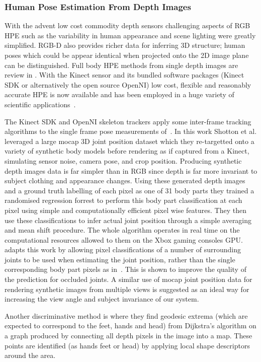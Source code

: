 \documentclass[11pt]{article} %
\begin{document}
\subsubsection{Human Pose Estimation From Depth Images}

With the advent low cost commodity depth sensors challenging aspects of RGB HPE such as the variability in human appearance and scene lighting were greatly simplified. RGB-D also provides richer data for inferring 3D structure; human poses which could be appear identical when projected onto the 2D image plane can be distinguished. Full body HPE methods from single depth images are review in \cite{Helten2013}. With the Kinect sensor and its bundled software packages (Kinect SDK or alternatively the open source OpenNI) low cost, flexible and reasonably accurate HPE is now available and has been employed in a huge variety of scientific applications~\cite{Han2013,Giovanni}.

The Kinect SDK and OpenNI skeleton trackers apply some inter-frame tracking algorithms to the single frame pose measurements of~\cite{Shotton2011}. In this work Shotton et al. leveraged a large mocap 3D joint position dataset which they re-targetted onto a variety of synthetic body models before rendering as if captured from a Kinect, simulating sensor noise, camera pose, and crop position. Producing synthetic depth images data is far simpler than in RGB since depth is far more invariant to subject clothing and appearance changes. Using these generated depth images and a ground truth labelling of each pixel as one of 31 body parts they trained a randomised regression forrest to perform this body part classification at each pixel using simple and computationally efficient pixel wise features. They then use these classifications to infer actual joint position through a simple averaging and mean shift procedure. The whole algorithm operates in real time on the computational resources allowed to them on the Xbox gaming consoles GPU. \cite{Shotton2013a} adapts this work by allowing pixel classifications of a number of surrounding joints to be used when estimating the joint position, rather than the single corresponding body part pixels as in~\cite{Shotton2011}. This is shown to improve the quality of the prediction for occluded joints. A similar use of mocap joint position data for rendering synthetic images from multiple views is suggested as an ideal way for increasing the view angle and subject invariance of our system.

Another discriminative method is \cite{Plagemann2010} where they find geodesic extrema (which are expected to correspond to the feet, hands and head) from Dijkstra’s algorithm on a graph produced by connecting all depth pixels in the image into a map. These points are identified (as hands feet or head) by applying local shape descriptors around the area. 
\end{document}
